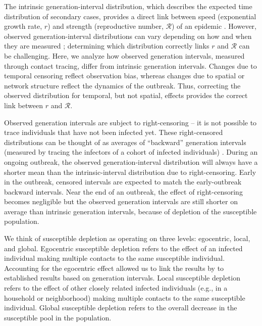 \documentclass[12pt]{article}
\newcommand{\RR}{\ensuremath{{\mathcal R}}}
\begin{document}
The intrinsic generation-interval distribution, which describes the expected time distribution of secondary cases, provides a direct link between speed (exponential growth rate, $r$) and strength (reproductive number, $\RR$) of an epidemic \citep{wallinga2007generation, svensson2007note, svensson2015influence, park2019practical}.
However, observed generation-interval distributions can vary depending on how and when they are measured \citep{nishiura2010time, tomba2010some, champredon2015intrinsic, britton2019estimation};
determining which distribution correctly links $r$ and $\RR$ can be challenging.
Here, we analyze how observed generation intervals, measured through contact tracing, differ from intrinsic generation intervals.
Changes due to temporal censoring reflect observation bias, whereas changes due to spatial or network structure reflect the dynamics of the outbreak.
Thus, correcting the observed distribution for temporal, but not spatial, effects provides the correct link between $r$ and $\RR$.

Observed generation intervals are subject to right-censoring -- it is not possible to trace individuals that have not been infected yet.
These right-censored distributions can be thought of as averages of ``backward'' generation intervals (measured by tracing the infectors of a cohort of infected individuals) \citep{kenah2008generation, nishiura2010time, tomba2010some, champredon2015intrinsic, britton2019estimation}.
During an ongoing outbreak, the observed generation-interval distribution will always have a shorter mean than the intrinsic-interval distribution due to right-censoring.
Early in the outbreak, censored intervals are expected to match the early-outbreak backward intervals.
Near the end of an outbreak, the effect of right-censoring becomes negligible but the observed generation intervals are still shorter on average than intrinsic generation intervals, because of depletion of the susceptible population.

We think of susceptible depletion as operating on three levels: egocentric, local, and global.
Egocentric susceptible depletion refers to the effect of an infected individual making multiple contacts to the same susceptible individual.
Accounting for the egocentric effect allowed us to link the results by \cite{trapman2016inferring} to established results based on generation intervals.
Local susceptible depletion refers to the effect of other closely related infected individuals (e.g., in a household or neighborhood) making multiple contacts to the same susceptible individual.
Global susceptible depletion refers to the overall decrease in the susceptible pool in the population.
\end{document}
